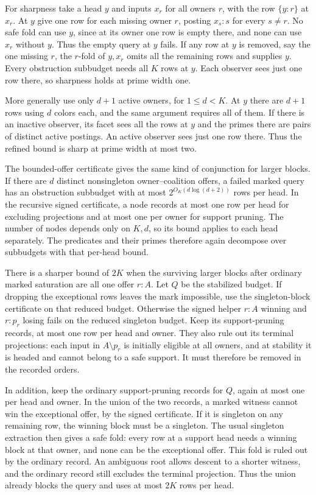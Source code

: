 For sharpness take a head $y$ and inputs $x_r$ for all
owners $r$, with the row $\{y:r\}$ at $x_r$. At $y$
give one row for each missing owner $r$, posting
$x_s:s$ for every $s\ne r$. No safe fold can use $y$,
since at its owner one row is empty there, and none
can use $x_r$ without $y$. Thus the empty query at $y$
fails. If any row at $y$ is removed, say the one
missing $r$, the $r$-fold of $y,x_r$ omits all the
remaining rows and supplies $y$. Every obstruction
subbudget needs all $K$ rows at $y$. Each observer
sees just one row there, so sharpness holds at
prime width one.

More generally use only $d+1$ active owners, for
$1\le d<K$. At $y$ there are $d+1$ rows using $d$ colors
each, and the same argument requires all of them. If there
is an inactive observer, its facet sees all the rows at
$y$ and the primes there are pairs of distinct active
postings. An active observer sees just one row there.
Thus the refined bound is sharp at prime width at most two.

The bounded-offer certificate gives the same kind of
conjunction for larger blocks. If there are $d$ distinct
nonsingleton owner--coalition offers, a failed marked
query has an obstruction subbudget with at most
$2^{O_K(d\log(d+2))}$ rows per head. In the recursive
signed certificate, a node records at most one row
per head for excluding projections and at most one
per owner for support pruning. The number of nodes
depends only on $K,d$, so its bound applies to each
head separately. The predicates and their primes
therefore again decompose over subbudgets with that
per-head bound.

There is a sharper bound of $2K$ when the surviving
larger blocks after ordinary marked saturation are
all one offer $r:A$. Let $Q$ be the stabilized budget.
If dropping the exceptional rows leaves the mark
impossible, use the singleton-block certificate on
that reduced budget. Otherwise the signed helper
$r:A$ winning and $r:p_r$ losing fails on the
reduced singleton budget. Keep its support-pruning
records, at most one row per head and owner.
They also rule out its terminal projections: each
input in $A\setminus p_r$ is initially eligible at
all owners, and at stability it is headed and cannot
belong to a safe support. It must therefore be
removed in the recorded orders.

In addition, keep the ordinary support-pruning
records for $Q$, again at most one per head and
owner. In the union of the two records, a marked
witness cannot win the exceptional offer, by the
signed certificate. If it is singleton on any
remaining row, the winning block must be a singleton.
The usual singleton extraction then gives a safe
fold: every row at a support head needs a winning
block at that owner, and none can be the exceptional
offer. This fold is ruled out by the ordinary record.
An ambiguous root allows descent to a shorter
witness, and the ordinary record still excludes the
terminal projection. Thus the union already blocks
the query and uses at most $2K$ rows per head.

